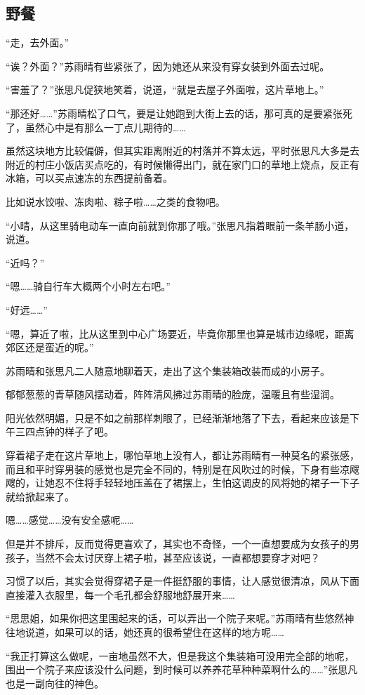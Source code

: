\subsection{野餐}

“走，去外面。”

“诶？外面？”苏雨晴有些紧张了，因为她还从来没有穿女装到外面去过呢。

“害羞了？”张思凡促狭地笑着，说道，“就是去屋子外面啦，这片草地上。”

“那还好……”苏雨晴松了口气，要是让她跑到大街上去的话，那可真的是要紧张死了，虽然心中是有那么一丁点儿期待的……

虽然这块地方比较偏僻，但其实距离附近的村落并不算太远，平时张思凡大多是去附近的村庄小饭店买点吃的，有时候懒得出门，就在家门口的草地上烧点，反正有冰箱，可以买点速冻的东西提前备着。

比如说水饺啦、冻肉啦、粽子啦……之类的食物吧。

“小晴，从这里骑电动车一直向前就到你那了哦。”张思凡指着眼前一条羊肠小道，说道。

“近吗？”

“嗯……骑自行车大概两个小时左右吧。”

“好远……”

“嗯，算近了啦，比从这里到中心广场要近，毕竟你那里也算是城市边缘呢，距离郊区还是蛮近的呢。”

苏雨晴和张思凡二人随意地聊着天，走出了这个集装箱改装而成的小房子。

郁郁葱葱的青草随风摆动着，阵阵清风拂过苏雨晴的脸庞，温暖且有些湿润。

阳光依然明媚，只是不如之前那样刺眼了，已经渐渐地落了下去，看起来应该是下午三四点钟的样子了吧。

穿着裙子走在这片草地上，哪怕草地上没有人，都让苏雨晴有一种莫名的紧张感，而且和平时穿男装的感觉也是完全不同的，特别是在风吹过的时候，下身有些凉飕飕的，让她忍不住将手轻轻地压盖在了裙摆上，生怕这调皮的风将她的裙子一下子就给掀起来了。

嗯……感觉……没有安全感呢……

但是并不排斥，反而觉得更喜欢了，其实也不奇怪，一个一直想要成为女孩子的男孩子，当然不会太讨厌穿上裙子啦，甚至应该说，一直都想要穿才对吧？

习惯了以后，其实会觉得穿裙子是一件挺舒服的事情，让人感觉很清凉，风从下面直接灌入衣服里，每一个毛孔都会舒服地舒展开来……

“思思姐，如果你把这里围起来的话，可以弄出一个院子来呢。”苏雨晴有些悠然神往地说道，如果可以的话，她还真的很希望住在这样的地方呢……

“我正打算这么做呢，一亩地虽然不大，但是我这个集装箱可没用完全部的地呢，围出一个院子来应该没什么问题，到时候可以养养花草种种菜啊什么的……”张思凡也是一副向往的神色。

